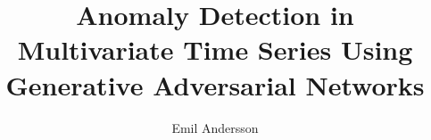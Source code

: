 \begin{titlepages}
\author{Emil Andersson}
\title{Anomaly Detection in \\ 
			Multivariate Time Series Using\\
            Generative Adversarial Networks}
\end{titlepages}